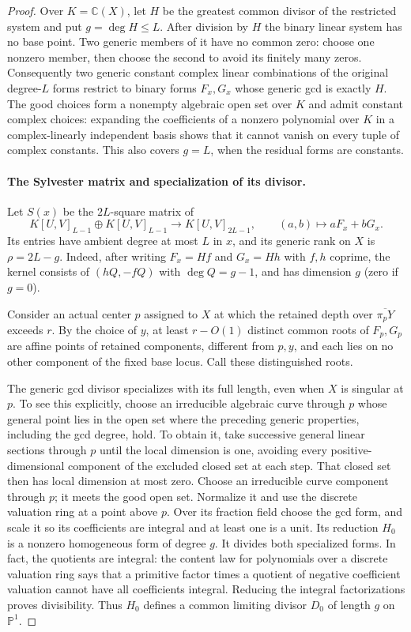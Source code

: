 \begin{proof}
Over $K=\mathbb C(X)$, let $H$ be the greatest common divisor of the
restricted system and put $g=\deg H\le L$.
After division by $H$ the binary linear system has no base point.
Two generic members of it have no common zero: choose one nonzero
member, then choose the second to avoid its finitely many zeros.
Consequently two generic constant complex linear combinations of
the original degree-$L$ forms restrict to binary forms $F_x,G_x$
whose generic gcd is exactly $H$.
The good choices form a nonempty algebraic open set over $K$ and
admit constant complex choices: expanding the coefficients of a
nonzero polynomial over $K$ in a complex-linearly independent basis
shows that it cannot vanish on every tuple of complex constants.
This also covers $g=L$, when the residual forms are constants.

\paragraph{The Sylvester matrix and specialization of its divisor.}
Let $S(x)$ be the $2L$-square matrix of
\[
 K[U,V]_{L-1}\oplus K[U,V]_{L-1}
 \longrightarrow K[U,V]_{2L-1},\qquad
 (a,b)\longmapsto aF_x+bG_x.
\]
Its entries have ambient degree at most $L$ in $x$, and its generic
rank on $X$ is $\rho=2L-g$.
Indeed, after writing $F_x=Hf$ and $G_x=Hh$ with $f,h$ coprime,
the kernel consists of $(hQ,-fQ)$ with $\deg Q=g-1$, and has dimension
$g$ (zero if $g=0$).

Consider an actual center $p$ assigned to $X$ at which the retained
depth over $\overline{\pi_pY}$ exceeds $r$. By the choice of $y$, at least
$r-O(1)$ distinct common roots of $F_p,G_p$ are affine points of
retained components, different from $p,y$, and each lies on no other
component of the fixed base locus. Call these distinguished roots.

The generic gcd divisor specializes with its full length, even when
$X$ is singular at $p$. To see this explicitly, choose an irreducible
algebraic curve through $p$ whose general point lies in the open set
where the preceding generic properties, including the gcd degree,
hold. To obtain it, take successive general linear sections through
$p$ until the local dimension is one, avoiding every
positive-dimensional component of the excluded closed set at each
step. That closed set then has local dimension at most zero.
Choose an irreducible curve component through $p$; it meets the good
open set. Normalize it and use the discrete
valuation ring at a point above $p$. Over its fraction field choose
the gcd form, and scale it so its coefficients are integral and at
least one is a unit. Its reduction $H_0$ is a nonzero homogeneous
form of degree $g$. It divides both specialized forms. In fact, the
quotients are integral: the content law for polynomials over a
discrete valuation ring says that a primitive factor times a quotient
of negative coefficient valuation cannot have all coefficients
integral. Reducing the integral factorizations proves divisibility.
Thus $H_0$ defines a common limiting divisor $D_0$ of length $g$ on
$\mathbb P^1$.


\end{proof}
